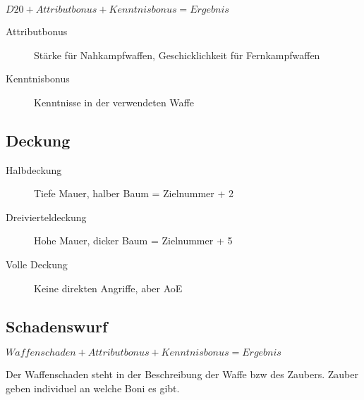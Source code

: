 \documentclass[paper=landscape,twocolumn=true,pagesize,DIV=14,fontsize=9pt]{scrartcl}
\begin{document}
\(D20 + Attributbonus + Kenntnisbonus = Ergebnis\)
\begin{description}
\item[Attributbonus] Stärke für Nahkampfwaffen, Geschicklichkeit für Fernkampfwaffen
\item[Kenntnisbonus] Kenntnisse in der verwendeten Waffe
\end{description}
\subsection{Deckung}
\begin{description}
\item[Halbdeckung] Tiefe Mauer, halber Baum = Zielnummer + 2
\item[Dreivierteldeckung] Hohe Mauer, dicker Baum = Zielnummer + 5
\item[Volle Deckung] Keine direkten Angriffe, aber AoE
\end{description}
\subsection{Schadenswurf}
\(Waffenschaden + Attributbonus + Kenntnisbonus = Ergebnis\)

Der Waffenschaden steht in der Beschreibung der Waffe bzw des Zaubers. Zauber geben individuel an welche Boni es gibt.
\end{document}
